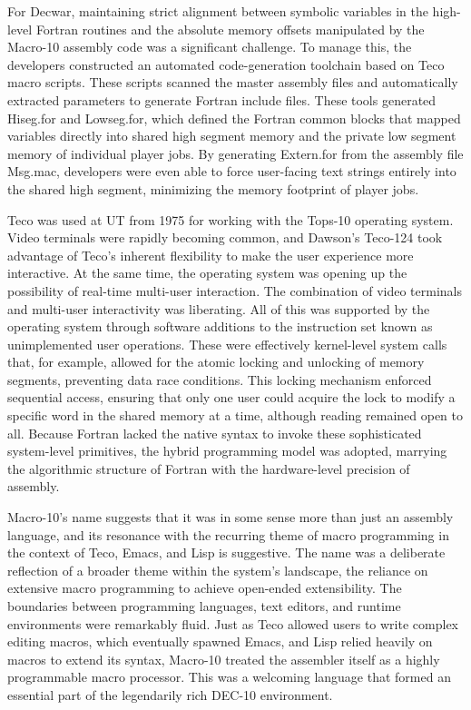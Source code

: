 For Decwar, maintaining strict alignment between symbolic variables in the high-level Fortran routines and the absolute memory offsets manipulated by the Macro-10 assembly code was a significant challenge. To manage this, the developers constructed an automated code-generation toolchain based on Teco macro scripts. These scripts scanned the master assembly files and automatically extracted parameters to generate Fortran include files. These tools generated Hiseg.for and Lowseg.for, which defined the Fortran common blocks that mapped variables directly into shared high segment memory and the private low segment memory of individual player jobs. By generating Extern.for from the assembly file Msg.mac, developers were even able to force user-facing text strings entirely into the shared high segment, minimizing the memory footprint of player jobs.

Teco was used at UT from 1975 for working with the Tops-10 operating system. Video terminals were rapidly becoming common, and Dawson’s Teco-124 took advantage of Teco’s inherent flexibility to make the user experience more interactive. At the same time, the operating system was opening up the possibility of real-time multi-user interaction. The combination of video terminals and multi-user interactivity was liberating. All of this was supported by the operating system through software additions to the instruction set known as unimplemented user operations. These were effectively kernel-level system calls that, for example, allowed for the atomic locking and unlocking of memory segments, preventing data race conditions. This locking mechanism enforced sequential access, ensuring that only one user could acquire the lock to modify a specific word in the shared memory at a time, although reading remained open to all. Because Fortran lacked the native syntax to invoke these sophisticated system-level primitives, the hybrid programming model was adopted, marrying the algorithmic structure of Fortran with the hardware-level precision of assembly. 

Macro-10’s name suggests that it was in some sense more than just an assembly language, and its resonance with the recurring theme of macro programming in the context of Teco, Emacs, and Lisp is suggestive. The name was a deliberate reflection of a broader theme within the system’s landscape, the reliance on extensive macro programming to achieve open-ended extensibility. The boundaries between programming languages, text editors, and runtime environments were remarkably fluid. Just as Teco allowed users to write complex editing macros, which eventually spawned Emacs, and Lisp relied heavily on macros to extend its syntax, Macro-10 treated the assembler itself as a highly programmable macro processor. This was a welcoming language that formed an essential part of the legendarily rich DEC-10 environment. 

